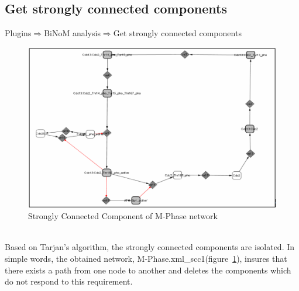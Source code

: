 \subsection{Get strongly connected components}
Plugins$\Rightarrow$BiNoM analysis$\Rightarrow$Get strongly connected components\\
\begin{figure}
\centering
\includegraphics[width=14 cm]{graphics/Strongly_Connected_Component_of_M-Phase_network.png}
\caption{Strongly Connected Component of M-Phase network}
\label{Strongly_Connected_Component_of M-Phase_network}
\end{figure}
\\Based on Tarjan’s algorithm\cite{tarjan1972depth}, the strongly connected components are isolated. In simple words, the obtained network, M-Phase.xml\_scc1(figure~\ref{Strongly_Connected_Component_of M-Phase_network}), insures that there exists a path from one node to another and deletes the components which do not respond to this requirement.
